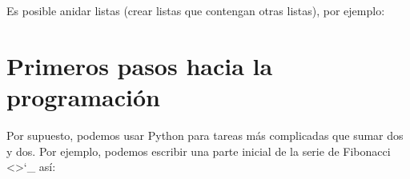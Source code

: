\documentclass[a5paper,10pt,spanish]{sphinxmanual}
\begin{document}
\sphinxAtStartPar
Es posible anidar listas (crear listas que contengan otras listas), por ejemplo:

\begin{sphinxVerbatim}[commandchars=\\\{\}]
  \PYG{p}{[}  \PYG{p}{]}
  \PYG{p}{[}  \PYG{p}{]}
  \PYG{p}{[} \PYG{p}{]}
\PYG{p}{[}\PYG{p}{]}
\PYG{p}{[}\PYG{p}{]}\PYG{p}{[}\PYG{p}{]}
\end{sphinxVerbatim}


\section{Primeros pasos hacia la programación}
\label{\detokenize{tutorial/introduction:first-steps-towards-programming}}\label{\detokenize{tutorial/introduction:tut-firststeps}}
\sphinxAtStartPar
Por supuesto, podemos usar Python para tareas más complicadas que sumar dos y dos. Por ejemplo, podemos escribir una parte inicial de la serie de Fibonacci <>`\_ así:

\begin{sphinxVerbatim}[commandchars=\\\{\}]
    
   
    
        
\end{sphinxVerbatim}
\end{document}
